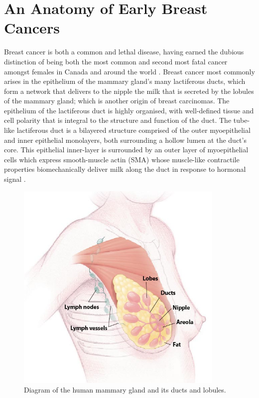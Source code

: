 \section{An Anatomy of Early Breast Cancers}
Breast cancer is both a common and lethal disease, having earned the dubious distinction of being both the most common and second most fatal cancer amongst females in Canada and around the world \citep{ccs2015}. Breast cancer most commonly arises in the epithelium of the mammary gland's many lactiferous ducts, which form a network that delivers to the nipple the milk that is secreted by the lobules of the mammary gland; which is another origin of breast carcinomas. The epithelium of the lactiferous duct is highly organised, with well-defined tissue and cell polarity that is integral to the structure and function of the duct. The tube-like lactiferous duct is a bilayered structure comprised of the outer myoepithelial and inner epithelial monolayers, both surrounding a hollow lumen at the duct's core. This epithelial inner-layer is surrounded by an outer layer of myoepithelial cells which express smooth-muscle actin (SMA) whose muscle-like contractile properties biomechanically deliver milk along the duct in response to hormonal signal \citep{Hamperl_1970}.\par

\begin{figure}[ht!]
	\centering
	\includegraphics[width=100mm]{figures/breast_anatomy.jpg}
	\caption{Diagram of the human mammary gland and its ducts and lobules. \label{overflow}}
\end{figure}

